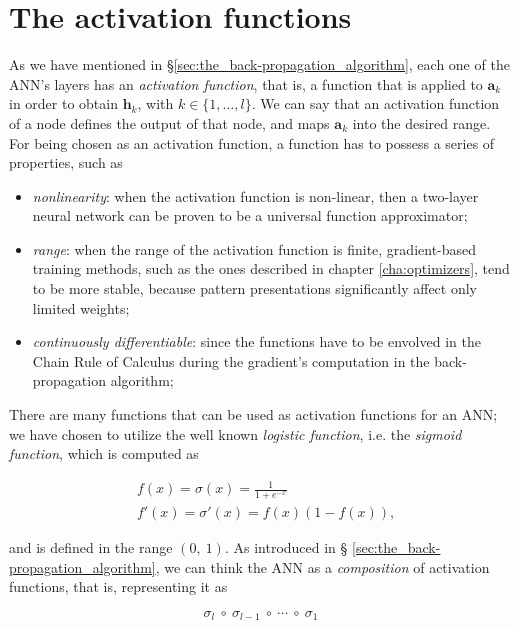 	\section{The activation functions} %
	\label{sec:the_activation_functions}
		As we have mentioned in \S \ref{sec:the_back-propagation_algorithm}, each one of the ANN's layers
		has an \textit{activation function}, that is, a function that is applied to $\mathbf{a}_{k}$ in order to
		obtain $\mathbf{h}_k$, with $k \in \{1,\ldots,l\}$. We can say that an activation function of a node
		defines the output of that node, and maps $\mathbf{a}_{k}$ into the desired range. For being chosen as
		an activation function, a function has to possess a series of properties, such as

		\begin{itemize}
			\item \textit{nonlinearity}: when the activation function is non-linear, then a two-layer neural
			network can be proven to be a universal function approximator;
			\item \textit{range}: when the range of the activation function is finite, gradient-based training
			methods, such as the ones described in chapter \ref{cha:optimizers}, tend to be more stable, because
			pattern presentations significantly affect only limited weights;
			\item \textit{continuously differentiable}: since the functions have to be envolved in the Chain Rule
			of Calculus during the gradient's computation in the back-propagation algorithm;
		\end{itemize}

		There are many functions that can be used as activation functions for an ANN; we have chosen to utilize the
		well known \textit{logistic function}, i.e. the \textit{sigmoid function}, which is computed as

		\begin{align*}
		    &f(x) = \sigma(x) = \frac{1}{1 + e^{-x}} \\
		    &f'(x) = \sigma'(x) = f(x)(1 - f(x)),
		\end{align*}

		and is defined in the range $\left ( 0,\ 1 \right )$. As introduced in \S
        \ref{sec:the_back-propagation_algorithm}, we can think the ANN as a \textit{composition} of activation
        functions, that is, representing it as

        \begin{equation*}
            \sigma_l \ \circ \ \sigma_{l - 1} \ \circ \ \cdots \ \circ \ \sigma_1
        \end{equation*}

